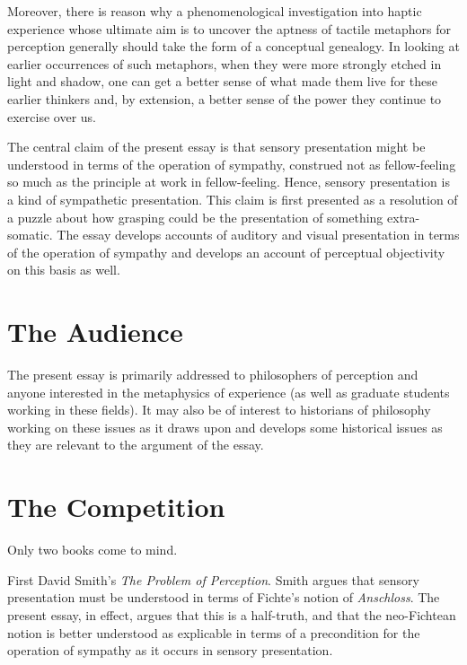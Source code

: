 \documentclass[12pt]{article}
\begin{document}
Moreover, there is reason why a phenomenological investigation into haptic experience whose ultimate aim is to uncover the aptness of tactile metaphors for perception generally should take the form of a conceptual genealogy. In looking at earlier occurrences of such metaphors, when they were more strongly etched in light and shadow, one can get a better sense of what made them live for these earlier thinkers and, by extension, a better sense of the power they continue to exercise over us.

The central claim of the present essay is that sensory presentation might be understood in terms of the operation of sympathy, construed not as fellow-feeling so much as the principle at work in fellow-feeling. Hence, sensory presentation is a kind of sympathetic presentation. This claim is first presented as a resolution of a puzzle about how grasping could be the presentation of something extra-somatic. The essay develops accounts of auditory and visual presentation in terms of the operation of sympathy and develops an account of perceptual objectivity on this basis as well.



\section{The Audience} %
\label{sec:the_audience}

The present essay is primarily addressed to philosophers of perception and anyone interested in the metaphysics of experience (as well as graduate students working in these fields). It may also be of interest to historians of philosophy working on these issues as it draws upon and develops some historical issues as they are relevant to the argument of the essay.


\section{The Competition} %
\label{sec:the_competition}

Only two books come to mind.

First David Smith's \emph{The Problem of Perception}. Smith argues that sensory presentation must be understood in terms of Fichte's notion of \emph{Anschloss}. The present essay, in effect, argues that this is a half-truth, and that the neo-Fichtean notion is better understood as explicable in terms of a precondition for the operation of sympathy as it occurs in sensory presentation.
\end{document}

